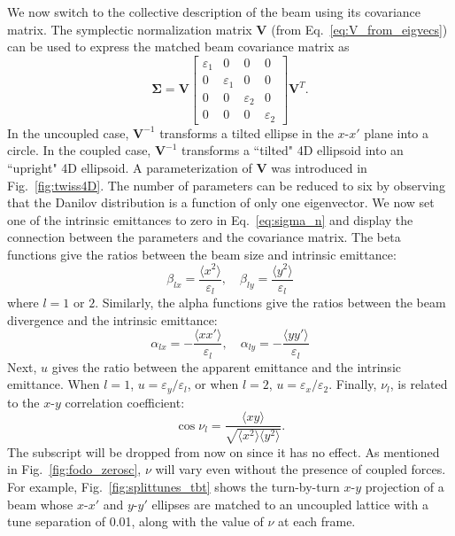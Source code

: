 We now switch to the collective description of the beam using its covariance matrix. The symplectic normalization matrix $\mathbf{V}$ (from Eq.~\eqref{eq:V_from_eigvecs}) can be used to express the matched beam covariance matrix as
%
\begin{equation}\label{eq:sigma_n}
    \bm{\Sigma} = 
    \mathbf{V}
    \begin{bmatrix}
        \varepsilon_1 & 0 & 0 & 0 \\
        0& \varepsilon_1 & 0 & 0 \\
        0 & 0 & \varepsilon_2 & 0 \\
        0 & 0 & 0 & \varepsilon_2
    \end{bmatrix}
    \mathbf{V}^T.
\end{equation}
%
In the uncoupled case, $\mathbf{V}^{-1}$ transforms a tilted ellipse in the $x$-$x'$ plane into a circle. In the coupled case, $\mathbf{V}^{-1}$ transforms a ``tilted" 4D ellipsoid into an ``upright" 4D ellipsoid. A parameterization of $\mathbf{V}$ was introduced in Fig.~\ref{fig:twiss4D}. The number of parameters can be reduced to six by observing that the Danilov distribution is a function of only one eigenvector. We now set one of the intrinsic emittances to zero in Eq.~\eqref{eq:sigma_n} and display the connection between the parameters and the covariance matrix. The beta functions give the ratios between the beam size and intrinsic emittance:
%
\begin{equation}
    \beta_{lx} = \frac{\langle{x^2}\rangle}{\varepsilon_l}, \quad
    \beta_{ly} = \frac{\langle{y^2}\rangle}{\varepsilon_l}
\end{equation}
%
where $l = 1$ or $2$. Similarly, the alpha functions give the ratios between the beam divergence and the intrinsic emittance:
%
\begin{equation}
    \alpha_{lx} = -\frac{\langle{xx'}\rangle}{\varepsilon_l}, \quad
    \alpha_{ly} = -\frac{\langle{yy'}\rangle}{\varepsilon_l}
\end{equation}
%
Next, $u$ gives the ratio between the apparent emittance and the intrinsic emittance. When $l = 1$, $u = \varepsilon_y / \varepsilon_l$, or when $l = 2$, $u = \varepsilon_x / \varepsilon_2$. Finally, $\nu_l$, is related to the $x$-$y$ correlation coefficient:
%
\begin{equation}
    \cos\nu_l = \frac{\langle{xy}\rangle}{\sqrt{\langle{x^2}\rangle\langle{y^2}\rangle}}.
\end{equation}
%
The subscript will be dropped from now on since it has no effect. As mentioned in Fig.~\ref{fig:fodo_zerosc}, $\nu$ will vary even without the presence of coupled forces. For example, Fig.~\ref{fig:splittunes_tbt} shows the turn-by-turn $x$-$y$ projection of a beam whose $x$-$x'$ and $y$-$y'$ ellipses are matched to an uncoupled lattice with a tune separation of 0.01, along with the value of $\nu$ at each frame. 
